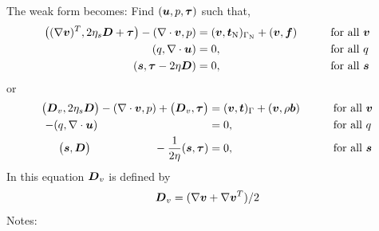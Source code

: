 The weak form becomes: Find $(\boldsymbol{u},p,\boldsymbol{\tau})$ such that,
\begin{alignat*}{2}
  \big((\nabla\boldsymbol{v})^T,2\eta_s\boldsymbol{D}+\boldsymbol{\tau}\big)-(\nabla\cdot\boldsymbol{v},p)&=(\boldsymbol{v},\boldsymbol{t}_\text{N})_{\Gamma_\text{N}}+(\boldsymbol{v},\boldsymbol{f})
&&\qquad\text{for all }\boldsymbol{v} \\
  (q,\nabla\cdot\boldsymbol{u})&=0,&&\qquad\text{for all }q\\
(\boldsymbol{s},\boldsymbol{\tau} -2\eta\boldsymbol{D})&=0,&&\qquad\text{for all }\boldsymbol{s}
\end{alignat*}
or
\begin{alignat*}{2}	
  \big(\ten D_v,2\eta_s\ten D\big)-(\nabla\cdot\vek v,p)
+ \big(\ten D_v,\ten \tau\big)&=(\vek v,\vek t)_\Gamma+(\vek v,\rho\vek b)
&&\qquad\text{for all }\vek v \\
  -(q,\nabla\cdot\vek u)\hspace{3.5cm}&=0,&&\qquad\text{for all }q\\
\big(\ten s,\ten D\big)\hspace{2cm}-\frac1{2\eta}(\ten s,\ten\tau) &=0,&&\qquad\text{for all }\ten s
\end{alignat*}
In this equation
$\boldsymbol{D}_v$ is defined by
\[
\boldsymbol{D}_v=(\nabla\boldsymbol{v}+\nabla\boldsymbol{v}^T)/2
\]
Notes:
